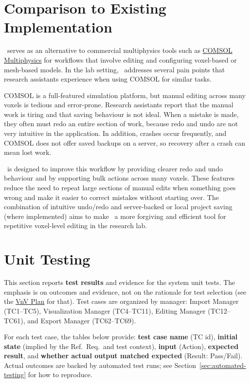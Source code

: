 \documentclass[12pt, titlepage]{article}
\begin{document}
	
\section{Comparison to Existing Implementation}\label{sec:comparison}

\progname\ serves as an alternative to commercial multiphysics tools such as \href{https://www.comsol.com/}{COMSOL Multiphysics\textregistered} for workflows that involve editing and configuring voxel-based or mesh-based models. In the lab setting, \progname\ addresses several pain points that research assistants experience when using COMSOL for similar tasks.

COMSOL is a full-featured simulation platform, but manual editing across many voxels is tedious and error-prone. Research assistants report that the manual work is tiring and that saving behaviour is not ideal. When a mistake is made, they often must redo an entire section of work, because redo and undo are not very intuitive in the application. In addition, crashes occur frequently, and COMSOL does not offer saved backups on a server, so recovery after a crash can mean lost work.

\progname\ is designed to improve this workflow by providing clearer redo and undo behaviour and by supporting bulk actions across many voxels. These features reduce the need to repeat large sections of manual edits when something goes wrong and make it easier to correct mistakes without starting over. The combination of intuitive undo/redo and server-backed or local project saving (where implemented) aims to make \progname\ a more forgiving and efficient tool for repetitive voxel-level editing in the research lab.

\section{Unit Testing}\label{sec:unit-testing}

This section reports \textbf{test results} and evidence for the system unit tests. The emphasis is on outcomes and evidence, not on the rationale for test selection (see the \href{https://github.com/OmarHassanAdelhamid/Five-of-a-Kind-capstone-project-/blob/main/docs/VnVPlan/VnVPlan.pdf}{VnV Plan} for that). Test cases are organized by manager: Import Manager (TC1--TC5), Visualization Manager (TC4--TC11), Editing Manager (TC12--TC61), and Export Manager (TC62--TC69).

For each test case, the tables below provide: \textbf{test case name} (TC id), \textbf{initial state} (implied by the Ref.\ Req.\ and test context), \textbf{input} (Action), \textbf{expected result}, and \textbf{whether actual output matched expected} (Result: Pass/Fail). Actual outcomes are backed by automated test runs; see Section~\ref{sec:automated-testing} for how to reproduce.
\end{document}

